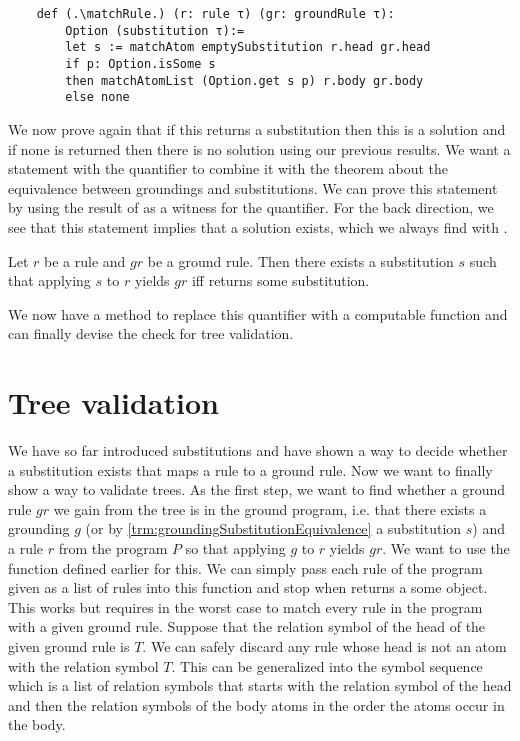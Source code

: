 \begin{lstlisting}
    def (.\matchRule.) (r: rule τ) (gr: groundRule τ):
        Option (substitution τ):=
        let s := matchAtom emptySubstitution r.head gr.head
        if p: Option.isSome s
        then matchAtomList (Option.get s p) r.body gr.body
        else none

\end{lstlisting}

We now prove again that if this returns a substitution then this is a solution and if none is returned then there is no solution using our previous results. 
We want a statement with the quantifier to combine it with the theorem about the equivalence between groundings and substitutions. We can prove this statement by using the result of \matchRule as a witness for the quantifier. For the back direction, we see that this statement implies that a solution exists, which we always find with \matchRule.

\begin{theorem}[\matchRuleIsSomeIffSolution]\label{trm:matchRule}
Let $r$  be a rule and $gr$ be a ground rule. Then there exists a substitution $s$ such that applying $s$ to $r$ yields $gr$ iff \matchRule returns some substitution.
\end{theorem}


We now have a method to replace this quantifier with a computable function and can finally devise the check for tree validation.

\section{Tree validation}

We have so far introduced substitutions and have shown a way to decide whether a substitution exists that maps a rule to a ground rule. Now we want to finally show a way to validate trees. As the first step, we want to find whether a ground rule $gr$ we gain from the tree is in the ground program, i.e. that there exists a grounding $g$ (or by \cref{trm:groundingSubstitutionEquivalence} a substitution $s$) and a rule $r$ from the program $P$ so that applying $g$ to $r$ yields $gr$. We want to use the \matchRule function defined earlier for this. 
We can simply pass each rule of the program given as a list of rules into this function and stop when \matchRule returns a some object. This works but requires in the worst case to match every rule in the program with a given ground rule. Suppose that the relation symbol of the head of the given ground rule is $T$. We can safely discard any rule whose head is not an atom with the relation symbol $T$. This can be generalized into the symbol sequence which is a list of relation symbols that starts with the relation symbol of the head and then the relation symbols of the body atoms in the order the atoms occur in the body.

